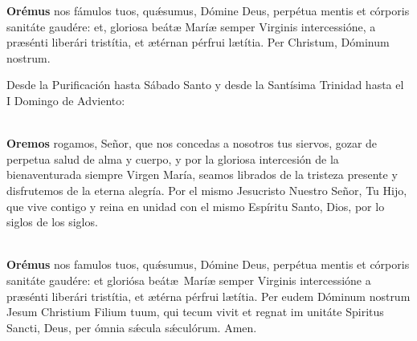 \documentclass[10pt,a4paper,oneside]{book}
\begin{document}
\begin{minipage}[t]{0.475\textwidth}
      \textbf{Orémus}
       nos fámulos tuos, qu{\'\ae}sumus, Dómine Deus, perpétua mentis et córporis sanitáte gaudére: et, gloriosa beát{\ae}
      Marí{\ae} semper Virginis intercessióne, a pr{\ae}sénti liberári tristítia, et {\ae}térnan pérfrui l{\ae}títia. Per Christum, Dóminum nostrum.
      \\
\end{minipage}

\newpage

\noindent\small{Desde la Purificación hasta Sábado Santo y desde la Santísima Trinidad hasta el I Domingo de Adviento:}\\
\begin{minipage}[t]{0.475\textwidth}
      \ruegapornosotrossalve\\[2mm]
      \textbf{Oremos}
       rogamos, Señor, que nos concedas a nosotros tus siervos, gozar de perpetua salud de alma y cuerpo, y por la gloriosa intercesión de la bienaventurada siempre Virgen
      María, seamos librados de la tristeza presente y disfrutemos de la eterna alegría. Por el mismo Jesucristo Nuestro Señor, Tu Hijo, que vive contigo y reina en unidad con el mismo Espíritu
      Santo, Dios, por lo siglos de los siglos.
\end{minipage}
\begin{minipage}[t]{0.475\textwidth}
      \orapronobissalve\\[2mm]
      \textbf{Orémus}
       nos famulos tuos, qu{\'\ae}sumus, Dómine Deus, perpétua mentis et córporis sanitáte gaudére: et gloriósa beát{\ae}\ Marí{\ae} semper Virginis intercessióne
      a pr{\ae}sénti liberári tristítia, et {\ae}térna pérfrui l{\ae}títia. Per eudem Dóminum nostrum Jesum Christium Filium tuum, qui tecum vivit et regnat im unitáte Spiritus Sancti,
      Deus, per ómnia s{\'\ae}cula s{\'\ae}culórum. Amen.\\
\end{minipage}

\bigskip
\end{document}
